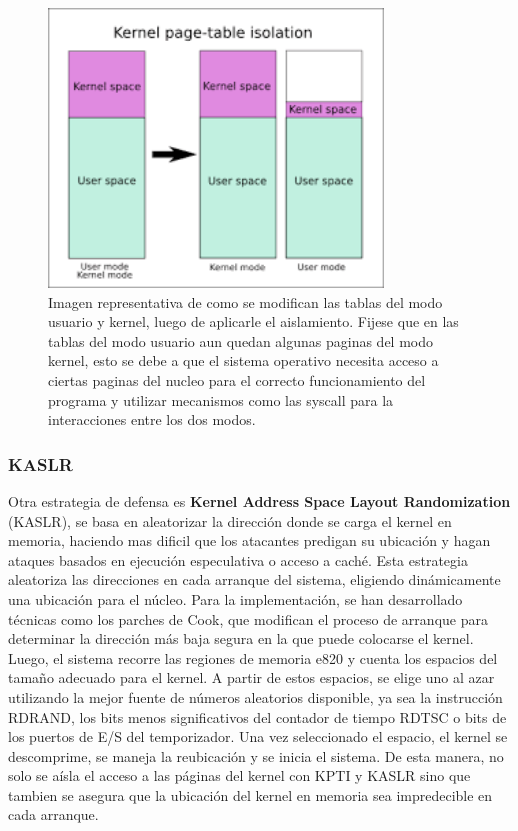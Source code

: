 \documentclass[lettersize,compsoc]{IEEEtran}
\begin{document}
\begin{figure}[h]
  \centering
  \includegraphics[width=3.5in]{../isolation-page.png}
  \caption{\small Imagen representativa de como se modifican las tablas del modo usuario y kernel, luego de aplicarle el aislamiento.
  \newline
  Fijese que en las tablas del modo usuario aun quedan algunas paginas del modo kernel, esto se debe a que el sistema operativo necesita acceso a ciertas paginas del nucleo para el correcto funcionamiento del programa y utilizar mecanismos como las syscall para la interacciones entre los dos modos.}
\end{figure}

\subsubsection{\textbf{KASLR}}
\noindent Otra estrategia de defensa es \textbf{Kernel Address Space Layout Randomization} (KASLR), se basa en aleatorizar la dirección donde se carga el kernel en memoria, haciendo mas dificil que los atacantes predigan su ubicación y hagan ataques basados en ejecución especulativa o acceso a caché.   Esta estrategia aleatoriza las direcciones en cada arranque del sistema, eligiendo dinámicamente una ubicación para el núcleo.
\noindent                                           %
\noindent Para la implementación, se han desarrollado técnicas como los parches de Cook, que modifican el proceso de arranque para determinar la dirección más baja segura en la que puede colocarse el kernel. Luego, el sistema recorre las regiones de memoria e820 y cuenta los espacios del tamaño adecuado para el kernel. A partir de estos espacios, se elige uno al azar utilizando la mejor fuente de números aleatorios disponible, ya sea la instrucción RDRAND, los bits menos significativos del contador de tiempo RDTSC o bits de los puertos de E/S del temporizador. Una vez seleccionado el espacio, el kernel se descomprime, se maneja la reubicación y se inicia el sistema.
\noindent
\noindent De esta manera, no solo se aísla el acceso a las páginas del kernel con KPTI y KASLR sino que tambien se asegura que la ubicación del kernel en memoria sea impredecible en cada arranque. 
\end{document}
